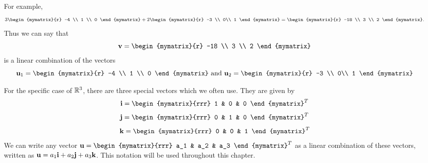For example, 
\begin{equation*}
3
\begin{mymatrix}{r}
-4 \\
1 \\
0
\end{mymatrix}
+
2
\begin{mymatrix}{r}
-3 \\
0\\
1
\end{mymatrix}
 =
\begin{mymatrix}{r}
-18 \\
3 \\
2
\end{mymatrix}. 
\end{equation*}
Thus we can say that
\begin{equation*}
\vect{v}= \begin{mymatrix}{r}
-18 \\
3 \\
2
\end{mymatrix}
\end{equation*}
is a linear combination of the vectors 
\begin{equation*}
\vect{u}_1 = \begin{mymatrix}{r}
-4 \\
1 \\
0
\end{mymatrix}
\mbox{ and } 
\vect{u}_2 = 
\begin{mymatrix}{r}
-3 \\
0\\
1
\end{mymatrix}
\end{equation*}

For the specific case of $\mathbb{R}^3$, there are three special vectors which we often use. 
They are given by 
\begin{equation*}
\vect{i} = 
\begin{mymatrix}{rrr}
1 & 0 & 0
\end{mymatrix}^T
\end{equation*}
\begin{equation*}
\vect{j} = 
\begin{mymatrix}{rrr}
0 & 1 & 0
\end{mymatrix}^T
\end{equation*}
\begin{equation*}
\vect{k} = 
\begin{mymatrix}{rrr}
0 & 0 & 1
\end{mymatrix}^T
\end{equation*}
We can write any vector $\vect{u} = 
\begin{mymatrix}{rrr}
a_1 & a_2 & a_3
\end{mymatrix}^T$
as a linear combination of these vectors, written as ${\bf u} = a_1 {\bf i} + a_2 {\bf j} + a_3 {\bf k}$. This notation will be used throughout 
this chapter.


